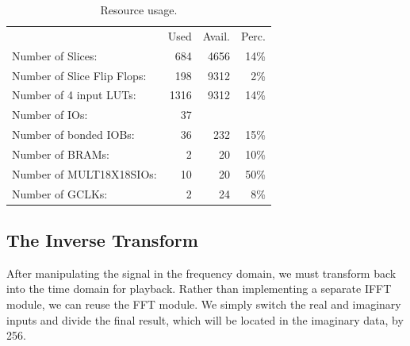\documentclass[twoside]{article}
\begin{document}
  \begin{table}[h]
  \begin{tabular}{l  r  r  r}
                                        & Used  & Avail. & Perc. \\
   Number of Slices:                    &  684  & 4656  &  14\%  \\
   Number of Slice Flip Flops:          &  198  & 9312  &   2\%  \\
   Number of 4 input LUTs:              & 1316  & 9312  &  14\%  \\
   Number of IOs:                       &   37  &       &      \\
   Number of bonded IOBs:               &   36  &  232  &  15\%  \\
   Number of BRAMs:                     &    2  &   20  &  10\%  \\
   Number of MULT18X18SIOs:             &   10  &   20  &  50\%  \\
   Number of GCLKs:                     &    2  &   24  &   8\%  \\
 \end{tabular}
 \caption{Resource usage.}
 \label{tab:usage}
 \end{table}
  
  
  
  \subsection{The Inverse Transform}
    After manipulating the signal in the frequency domain, we must transform back into the time domain for playback. 
    Rather than implementing a separate IFFT module, we can reuse the FFT module.  We simply switch the real and imaginary
    inputs and divide the final result, which will be located in the imaginary data, by 256.

%
%
%
%
\end{document}
